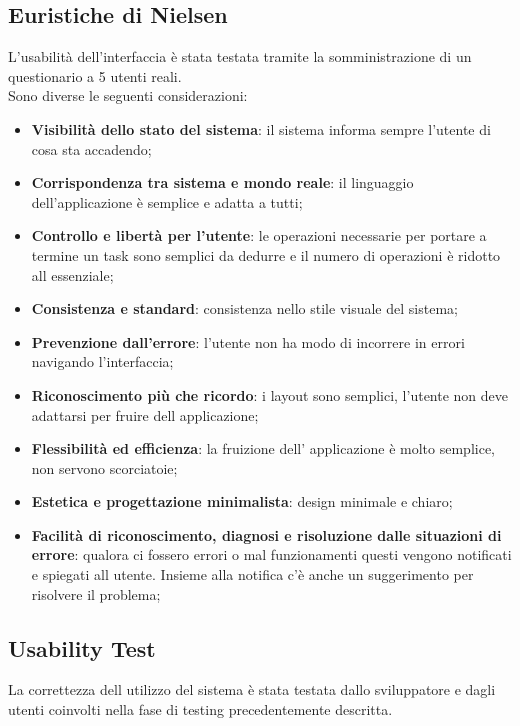 \documentclass{report}
\begin{document}
\subsection{Euristiche di Nielsen}
L'usabilità dell'interfaccia è stata testata tramite la somministrazione di un questionario a 5 utenti reali.\\
Sono diverse le seguenti considerazioni:
\begin{itemize}
    \item \textbf{Visibilità dello stato del sistema}: il sistema informa sempre l'utente di cosa sta accadendo;
    \item \textbf{Corrispondenza tra sistema e mondo reale}: il linguaggio dell'applicazione è semplice e adatta a tutti;
    \item  \textbf{Controllo e libertà per l’utente}: le operazioni necessarie per portare a termine un task sono semplici da dedurre e il numero di operazioni è ridotto all essenziale;
    \item \textbf{Consistenza e standard}: consistenza nello stile visuale del sistema;
    \item \textbf{Prevenzione dall’errore}: l'utente non ha modo di incorrere in errori navigando l'interfaccia;
    \item \textbf{Riconoscimento più che ricordo}: i layout sono semplici, l'utente non deve adattarsi per fruire dell applicazione;
    \item  \textbf{Flessibilità ed efficienza}: la fruizione dell' applicazione è molto semplice, non servono scorciatoie;
    \item \textbf{Estetica e progettazione minimalista}: design minimale e chiaro;
    \item \textbf{Facilità di riconoscimento, diagnosi e risoluzione dalle situazioni di errore}: qualora ci fossero errori o mal funzionamenti questi vengono notificati e spiegati all utente. Insieme alla notifica c'è anche un suggerimento per risolvere il problema;
\end{itemize}
\subsection{Usability Test}
La correttezza dell utilizzo del sistema è stata testata dallo sviluppatore e dagli utenti coinvolti nella fase di testing precedentemente descritta.
\end{document}
